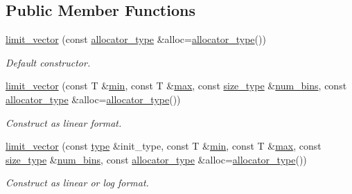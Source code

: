 \subsection*{Public Member Functions}
\begin{DoxyCompactItemize}
\item 
\hyperlink{classIceBRG_1_1limit__vector_a327dc940f2b7380e9af32935d449c911}{limit\+\_\+vector} (const \hyperlink{classIceBRG_1_1limit__vector_ac75a579f04baed676ee916b0ad3dfec0}{allocator\+\_\+type} \&alloc=\hyperlink{classIceBRG_1_1limit__vector_ac75a579f04baed676ee916b0ad3dfec0}{allocator\+\_\+type}())
\begin{DoxyCompactList}\small\item\em Default constructor. \end{DoxyCompactList}\item 
\hyperlink{classIceBRG_1_1limit__vector_a4f32922dba34667d42bb84d7dc041470}{limit\+\_\+vector} (const T \&\hyperlink{classIceBRG_1_1limit__vector_a6dddba344399189344e410ddca2615d6}{min}, const T \&\hyperlink{classIceBRG_1_1limit__vector_a4f020c6f3e092f6cbfdc3c015de83667}{max}, const \hyperlink{classIceBRG_1_1limit__vector_a81be3eb6cd519b3f5279ef735ccc4c2f}{size\+\_\+type} \&\hyperlink{classIceBRG_1_1limit__vector_af09ecb88fd55929c0b08faa63c9a3e1c}{num\+\_\+bins}, const \hyperlink{classIceBRG_1_1limit__vector_ac75a579f04baed676ee916b0ad3dfec0}{allocator\+\_\+type} \&alloc=\hyperlink{classIceBRG_1_1limit__vector_ac75a579f04baed676ee916b0ad3dfec0}{allocator\+\_\+type}())
\begin{DoxyCompactList}\small\item\em Construct as linear format. \end{DoxyCompactList}\item 
\hyperlink{classIceBRG_1_1limit__vector_a29d9cb5b0fe483c5d70642a999423af9}{limit\+\_\+vector} (const \hyperlink{classIceBRG_1_1limit__vector_a67ad5ccda3b716a3aca2fa6223e75681}{type} \&init\+\_\+type, const T \&\hyperlink{classIceBRG_1_1limit__vector_a6dddba344399189344e410ddca2615d6}{min}, const T \&\hyperlink{classIceBRG_1_1limit__vector_a4f020c6f3e092f6cbfdc3c015de83667}{max}, const \hyperlink{classIceBRG_1_1limit__vector_a81be3eb6cd519b3f5279ef735ccc4c2f}{size\+\_\+type} \&\hyperlink{classIceBRG_1_1limit__vector_af09ecb88fd55929c0b08faa63c9a3e1c}{num\+\_\+bins}, const \hyperlink{classIceBRG_1_1limit__vector_ac75a579f04baed676ee916b0ad3dfec0}{allocator\+\_\+type} \&alloc=\hyperlink{classIceBRG_1_1limit__vector_ac75a579f04baed676ee916b0ad3dfec0}{allocator\+\_\+type}())
\begin{DoxyCompactList}\small\item\em Construct as linear or log format. \end{DoxyCompactList}\item 

\end{DoxyCompactItemize}

